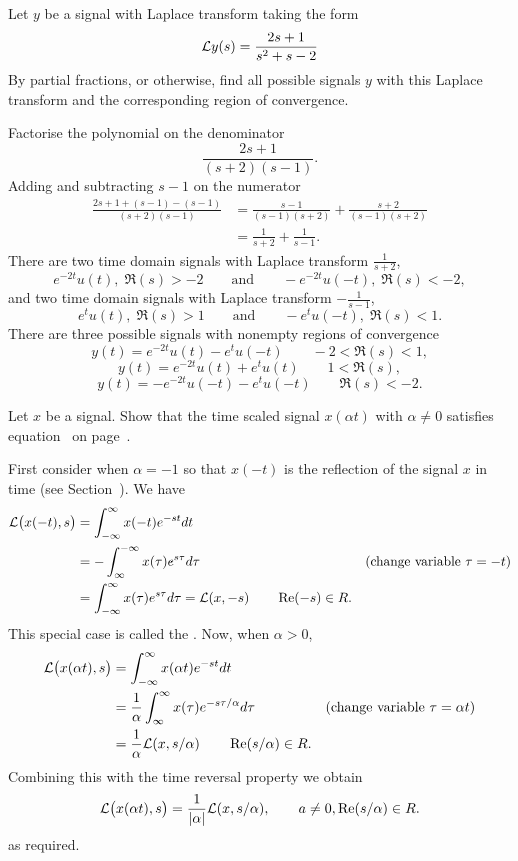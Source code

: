 \begin{excersizelist}
\item Let $y$ be a signal with Laplace transform taking the form
\[
\mathcal L y(s) = \frac{2s + 1}{s^2 + s - 2}
\]
By partial fractions, or otherwise, find all possible signals $y$ with this Laplace transform and the corresponding region of convergence. 
\begin{solution}
Factorise the polynomial on the denominator
\[
\frac{2s + 1}{(s+2)(s-1)}.
\]
Adding and subtracting $s-1$ on the numerator 
\begin{align*}
\frac{2s + 1 + (s-1) - (s-1)}{(s+2)(s-1)} &= \frac{s-1}{(s-1)(s+2)} + \frac{s+2}{(s-1)(s+2)} \\
&= \frac{1}{s+2} + \frac{1}{s-1}.
\end{align*}
There are two time domain signals with Laplace transform $\frac{1}{s+2}$,
\[
e^{-2t} u(t), \; \Re(s) > -2 \qquad \text{and} \qquad -e^{-2t}u(-t), \; \Re(s) < -2,
\] 
and two time domain signals with Laplace transform $-\frac{1}{s-1}$,
 \[
e^{t}u(t), \; \Re(s) > 1 \qquad \text{and} \qquad -e^{t} u(-t), \; \Re(s) < 1.
\] 
There are three possible signals with nonempty regions of convergence
\[
y(t) = e^{-2t} u(t) - e^{t} u(-t) \qquad -2 < \Re(s) < 1,
\]
\[
y(t) = e^{-2t} u(t) + e^{t} u(t) \qquad 1 < \Re(s),
\]
\[
y(t) = - e^{-2t} u(-t) - e^{t} u(-t) \qquad \Re(s) < -2.
\]
\end{solution}

\item \label{excer:timescalelaplace} Let $x$ be a signal.  Show that the time scaled signal $x(\alpha t)$ with $\alpha \neq 0$ satisfies equation~ on page~.
\begin{solution}
First consider when $\alpha = -1$ so that $x(-t)$ is the reflection of the signal $x$ in time (see Section~).  We have 
\begin{align*}
 \mathcal L\big( x(-t), s \big) &=  \int_{-\infty}^{\infty} x(-t)  e^{-s t} dt \\
 &=  -\int_{\infty}^{-\infty} x(\tau)  e^{s\tau} d\tau & \text{(change variable $\tau = -t$)}\\
 &=  \int_{-\infty}^{\infty} x(\tau)  e^{ s \tau} d\tau = \mathcal L(x, -s) \qquad \operatorname{Re}(-s) \in R.
 \end{align*}
 This special case is called the .  Now, when $\alpha > 0$,
 \begin{align*}
 \mathcal L\big( x(\alpha t), s \big) &=  \int_{-\infty}^{\infty} x(\alpha t)  e^{-s t} dt \\
 &=  \frac{1}{\alpha} \int_{\infty}^{\infty} x(\tau)  e^{-s \tau / \alpha}  d\tau & \text{(change variable $\tau = \alpha t$)}\\
 &= \frac{1}{\alpha} \mathcal L(x, s / \alpha) \qquad \operatorname{Re}(s/\alpha) \in R.
 \end{align*}
Combining this with the time reversal property we obtain
 \[
 \mathcal L\big(x(\alpha t),s\big) = \frac{1}{\left\vert \alpha \right\vert} \mathcal L(x, s/\alpha), \qquad a \neq 0, \operatorname{Re}(s/\alpha) \in R.
 \]
as required.
\end{solution}


\end{excersizelist}
